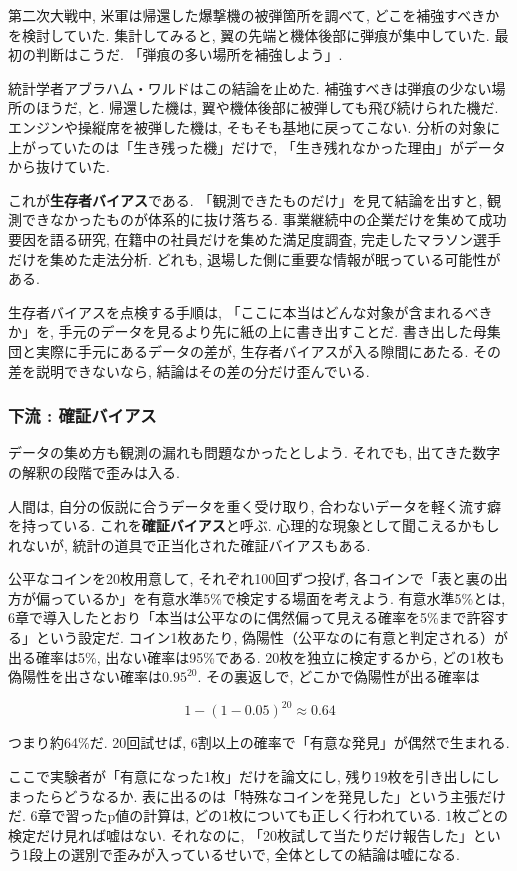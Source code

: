 第二次大戦中, 米軍は帰還した爆撃機の被弾箇所を調べて, どこを補強すべきかを検討していた.
集計してみると, 翼の先端と機体後部に弾痕が集中していた.
最初の判断はこうだ. 「弾痕の多い場所を補強しよう」.

統計学者アブラハム・ワルドはこの結論を止めた.
補強すべきは弾痕の少ない場所のほうだ, と.
帰還した機は, 翼や機体後部に被弾しても飛び続けられた機だ.
エンジンや操縦席を被弾した機は, そもそも基地に戻ってこない.
分析の対象に上がっていたのは「生き残った機」だけで, 「生き残れなかった理由」がデータから抜けていた.

これが\textbf{生存者バイアス}である.
「観測できたものだけ」を見て結論を出すと, 観測できなかったものが体系的に抜け落ちる.
事業継続中の企業だけを集めて成功要因を語る研究, 在籍中の社員だけを集めた満足度調査, 完走したマラソン選手だけを集めた走法分析.
どれも, 退場した側に重要な情報が眠っている可能性がある.

生存者バイアスを点検する手順は, 「ここに本当はどんな対象が含まれるべきか」を, 手元のデータを見るより先に紙の上に書き出すことだ.
書き出した母集団と実際に手元にあるデータの差が, 生存者バイアスが入る隙間にあたる.
その差を説明できないなら, 結論はその差の分だけ歪んでいる.

\subsubsection*{下流 : 確証バイアス}

データの集め方も観測の漏れも問題なかったとしよう.
それでも, 出てきた数字の解釈の段階で歪みは入る.

人間は, 自分の仮説に合うデータを重く受け取り, 合わないデータを軽く流す癖を持っている.
これを\textbf{確証バイアス}と呼ぶ.
心理的な現象として聞こえるかもしれないが, 統計の道具で正当化された確証バイアスもある.

公平なコインを20枚用意して, それぞれ100回ずつ投げ, 各コインで「表と裏の出方が偏っているか」を有意水準5\%で検定する場面を考えよう.
有意水準5\%とは, 6章で導入したとおり「本当は公平なのに偶然偏って見える確率を5\%まで許容する」という設定だ.
コイン1枚あたり, 偽陽性（公平なのに有意と判定される）が出る確率は5\%, 出ない確率は95\%である.
20枚を独立に検定するから, どの1枚も偽陽性を出さない確率は$0.95^{20}$. その裏返しで, どこかで偽陽性が出る確率は

$$
1 - (1 - 0.05)^{20} \approx 0.64
$$

つまり約64\%だ. 20回試せば, 6割以上の確率で「有意な発見」が偶然で生まれる.

ここで実験者が「有意になった1枚」だけを論文にし, 残り19枚を引き出しにしまったらどうなるか.
表に出るのは「特殊なコインを発見した」という主張だけだ.
6章で習ったp値の計算は, どの1枚についても正しく行われている.
1枚ごとの検定だけ見れば嘘はない.
それなのに, 「20枚試して当たりだけ報告した」という1段上の選別で歪みが入っているせいで, 全体としての結論は嘘になる.


